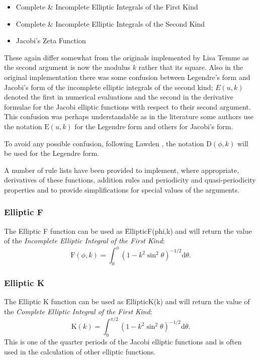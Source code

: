 \begin{itemize}
\item Complete \& Incomplete Elliptic Integrals of the First Kind
\item Complete \& Incomplete Elliptic Integrals of the Second Kind
\item Jacobi's Zeta Function
\end{itemize}

These again differ somewhat from the originals implemented by Lisa Temme
as the second argument is now the modulus $k$ rather that its square.
Also in the original implementation  there was some confusion between
Legendre's form and Jacobi's form of the incomplete elliptic integrals of
the second kind; $E(u,k)$ denoted the first in numerical
evaluations and the second in the derivative formulae for the Jacobi
elliptic functions with respect to their second argument.
This confusion was perhaps understandable
as in the literature some authors use the notation $\mathrm{E}(u, k)$ for
the Legendre form and others for Jacobi's form.

To avoid any possible confusion, following Lawden \cite{Lawden:89}, the notation
$\mathrm{D}(\phi, k)$ will be used for the Legendre form.

A number of rule lists have been provided to implement, where appropriate,
derivatives of these functions, addition rules and periodicity and
quasi-periodicity properties and to provide simplifications for special values
of the arguments.

\subsubsection{Elliptic F}

The Elliptic F function can be used as \f{EllipticF(phi,k)} and 
will return the value of the \emph{Incomplete Elliptic Integral of the 
First Kind}:
\[\mathrm{F}(\phi, k)=\int_0^\phi(1-k^2 \sin^2 \theta)^{-1/2} \mathrm{d}\theta.\]

\subsubsection{Elliptic K}

The Elliptic K function can be used as \f{EllipticK(k)} and will 
return the value of the \emph{Complete Elliptic Integral of the
First Kind}:
\[\mathrm{K}(k)=\int_0^{\pi/2}(1-k^2 \sin^2 \theta)^{-1/2}\mathrm{d}\theta.\]
This is one of the quarter periods of the Jacobi elliptic
functions and is often used in the calculation of other elliptic
functions.

